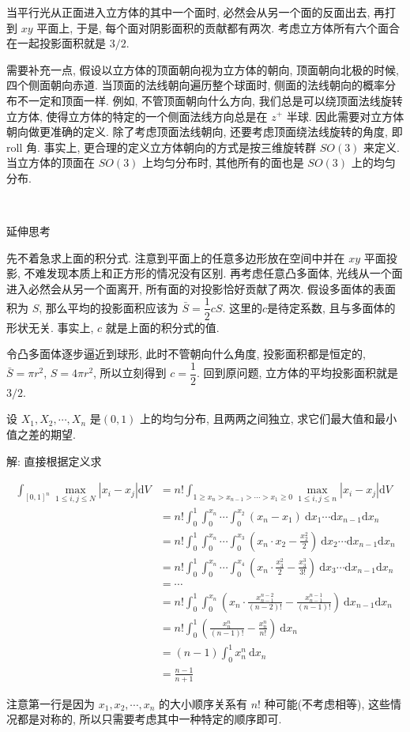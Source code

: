 当平行光从正面进入立方体的其中一个面时, 必然会从另一个面的反面出去, 再打到 $xy$ 平面上, 于是, 每个面对阴影面积的贡献都有两次. 考虑立方体所有六个面合在一起投影面积就是 $3/2$.

需要补充一点, 假设以立方体的顶面朝向视为立方体的朝向, 顶面朝向北极的时候, 四个侧面朝向赤道. 
当顶面的法线朝向遍历整个球面时, 侧面的法线朝向的概率分布不一定和顶面一样.
例如, 不管顶面朝向什么方向, 我们总是可以绕顶面法线旋转立方体, 使得立方体的特定的一个侧面法线方向总是在 $z^+$ 半球.
因此需要对立方体朝向做更准确的定义. 除了考虑顶面法线朝向, 还要考虑顶面绕法线旋转的角度, 即 roll 角. 事实上, 更合理的定义立方体朝向的方式是按三维旋转群 $SO(3)$ 来定义. 当立方体的顶面在 $SO(3)$ 上均匀分布时, 其他所有的面也是 $SO(3)$ 上的均匀分布.

~

\noindent 延伸思考

先不着急求上面的积分式. 注意到平面上的任意多边形放在空间中并在 $xy$ 平面投影, 不难发现本质上和正方形的情况没有区别. 再考虑任意凸多面体, 光线从一个面进入必然会从另一个面离开, 所有面的对投影恰好贡献了两次. 假设多面体的表面积为 $S$, 那么平均的投影面积应该为 $\bar{S}=\dfrac{1}{2}{c}{S}$. 这里的$c$是待定系数, 且与多面体的形状无关. 事实上, $c$ 就是上面的积分式的值.

令凸多面体逐步逼近到球形, 此时不管朝向什么角度, 投影面积都是恒定的, $\bar{S} = \pi r^2$, $S=4\pi r^2$, 所以立刻得到 $c=\dfrac{1}{2}$. 回到原问题, 立方体的平均投影面积就是 $3/2$.


\newpage

设 $X_1, X_2, \cdots, X_n$ 是$(0,1)$ 上的均匀分布, 且两两之间独立, 求它们最大值和最小值之差的期望.

解: 直接根据定义求

\begin{align*}
\int_{[0,1]^n} {\max_{1\le i,j\le N}|x_i-x_j| \mathrm{d}V} &= n!\int_{1\ge x_n > x_{n-1}>\cdots >x_1\ge 0} {\max_{1\le i,j\le n}|x_i-x_j|} \mathrm{d}V\\
&= n!\int_0^1 \int_0^{x_n} \cdots \int_0^{x_2}{(x_n-x_1)}\ \mathrm{d}x_1\cdots\mathrm{d}x_{n-1}\mathrm{d}x_n\\
&= n!\int_0^1 \int_0^{x_n} \cdots \int_0^{x_3}{\left(x_n\cdot x_2-\frac{x_2^2}{2}\right)}\ \mathrm{d}x_2\cdots\mathrm{d}x_{n-1}\mathrm{d}x_n\\
&= n!\int_0^1 \int_0^{x_n} \cdots \int_0^{x_4}{\left(x_n\cdot\frac{x_3^2}{2}-\frac{x_3^3}{3!}\right)}\ \mathrm{d}x_3\cdots\mathrm{d}x_{n-1}\mathrm{d}x_n\\
&=\cdots\\
&=n!\int_0^1 \int_0^{x_n} {\left(x_n\cdot\frac{x_{n-1}^{n-2}}{(n-2)!}-\frac{x_{n-1}^{n-1}}{(n-1)!}\right)}\  \mathrm{d}x_{n-1}\mathrm{d}x_n\\
&=n!\int_0^1{\left(\frac{x_n^n}{(n-1)!} - \frac{x_n^n}{n!}\right)}\ \mathrm{d}x_n\\
&=(n-1)\int_0^1{x_n^n}\ \mathrm{d}x_n\\
&=\frac{n-1}{n+1}
\end{align*}

注意第一行是因为 $x_1,x_2,\cdots,x_n$ 的大小顺序关系有 $n!$ 种可能(不考虑相等), 这些情况都是对称的, 所以只需要考虑其中一种特定的顺序即可.
















